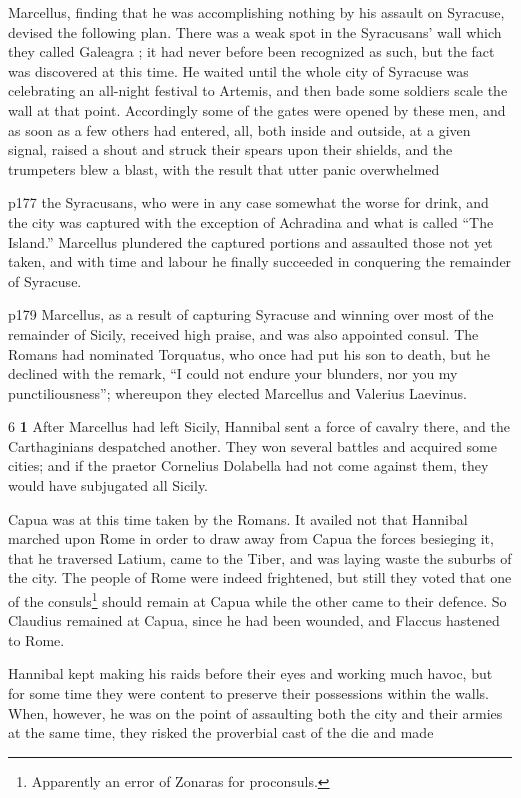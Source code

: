 Marcellus, finding that he was accomplishing nothing by his assault on Syracuse, devised the following plan. There was a weak spot in the Syracusans' wall which they called Galeagra ; it had never before been recognized as such, but the fact was discovered at this time. He waited until the whole city of Syracuse was celebrating an all-night festival to Artemis, and then bade some soldiers scale the wall at that point. Accordingly some of the gates were opened by these men, and as soon as a few others had entered, all, both inside and outside, at a given signal, raised a shout and struck their spears upon their shields, and the trumpeters blew a blast, with the result that utter panic overwhelmed

p177 the Syracusans, who were in any case somewhat the worse for drink, and the city was captured with the exception of Achradina and what is called ``The Island.'' Marcellus plundered the captured portions and assaulted those not yet taken, and with time and labour he finally succeeded in conquering the remainder of Syracuse.

p179
Marcellus, as a result of capturing Syracuse and winning over most of the remainder of Sicily, received high praise, and was also appointed consul. The Romans had nominated Torquatus, who once had put his son to death, but he declined with the remark, ``I could not endure your blunders, nor you my punctiliousness''; whereupon they elected Marcellus and Valerius Laevinus.

6 \textbf{1} After Marcellus had left Sicily, Hannibal sent a force of cavalry there, and the Carthaginians despatched another. They won several battles and acquired some cities; and if the praetor Cornelius Dolabella had not come against them, they would have subjugated all Sicily.

Capua was at this time taken by the Romans. It availed not that Hannibal marched upon Rome in order to draw away from Capua the forces besieging it, that he traversed Latium, came to the Tiber, and was laying waste the suburbs of the city. The people of Rome were indeed frightened, but still they voted that one of the consuls\texthebrew{⁠}\footnote{Apparently an error of Zonaras for proconsuls.

} should remain at Capua while the other came to their defence. So Claudius remained at Capua, since he had been wounded, and Flaccus hastened to Rome.

Hannibal kept making his raids before their eyes and working much havoc, but for some time they were content to preserve their possessions within the walls. When, however, he was on the point of assaulting both the city and their armies at the same time, they risked the proverbial cast of the die and made

